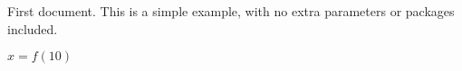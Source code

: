 \documentclass{article}
\begin{document}
First document. This is a simple example, with no 
extra parameters or packages included.

$x = f(10)$
\end{document}
